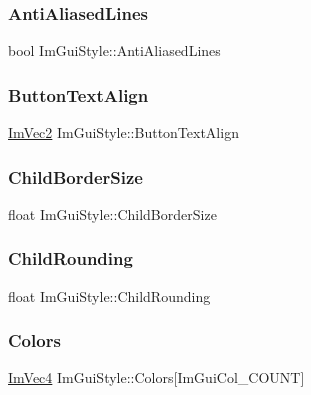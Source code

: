 \subsubsection{\texorpdfstring{Anti\+Aliased\+Lines}{AntiAliasedLines}}
{\footnotesize\ttfamily bool Im\+Gui\+Style\+::\+Anti\+Aliased\+Lines}

\hypertarget{struct_im_gui_style_a17246b12f4e069229d21808a87f78514}{}\label{struct_im_gui_style_a17246b12f4e069229d21808a87f78514} 
\subsubsection{\texorpdfstring{Button\+Text\+Align}{ButtonTextAlign}}
{\footnotesize\ttfamily \hyperlink{struct_im_vec2}{Im\+Vec2} Im\+Gui\+Style\+::\+Button\+Text\+Align}

\hypertarget{struct_im_gui_style_a5dd4fc33733ac7171d88740eb777f2e3}{}\label{struct_im_gui_style_a5dd4fc33733ac7171d88740eb777f2e3} 
\subsubsection{\texorpdfstring{Child\+Border\+Size}{ChildBorderSize}}
{\footnotesize\ttfamily float Im\+Gui\+Style\+::\+Child\+Border\+Size}

\hypertarget{struct_im_gui_style_aba2b4c6be52366ce2ac06b7849cd5cb2}{}\label{struct_im_gui_style_aba2b4c6be52366ce2ac06b7849cd5cb2} 
\subsubsection{\texorpdfstring{Child\+Rounding}{ChildRounding}}
{\footnotesize\ttfamily float Im\+Gui\+Style\+::\+Child\+Rounding}

\hypertarget{struct_im_gui_style_a2b4941240a38d1300c39a7fa4f03d0a3}{}\label{struct_im_gui_style_a2b4941240a38d1300c39a7fa4f03d0a3} 
\subsubsection{\texorpdfstring{Colors}{Colors}}
{\footnotesize\ttfamily \hyperlink{struct_im_vec4}{Im\+Vec4} Im\+Gui\+Style\+::\+Colors\mbox{[}Im\+Gui\+Col\+\_\+\+C\+O\+U\+NT\mbox{]}}

